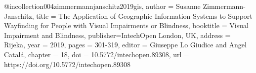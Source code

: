 @incollection{004zimmermannjanschitz2019gis,
author = {Susanne Zimmermann-Janschitz},
title = {The Application of Geographic Information Systems to Support Wayfinding for People with Visual Impairments or Blindness},
booktitle = {Visual Impairment and Blindness},
publisher={IntechOpen London, UK},
address = {Rijeka},
year = {2019},
pages = {301-319},
editor = {Giuseppe Lo Giudice and Angel Catalá},
chapter = {18},
doi = {10.5772/intechopen.89308},
url = {https://doi.org/10.5772/intechopen.89308}
}
